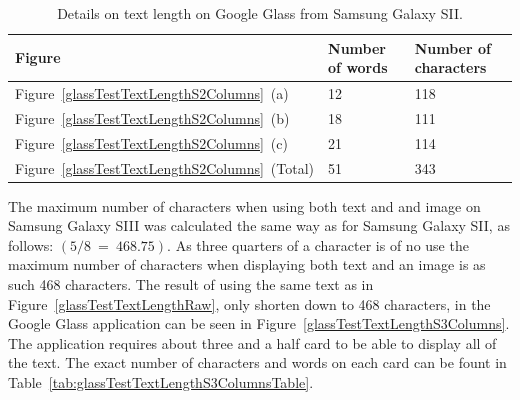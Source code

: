 	\begin{table}[ht!]
    		\caption{Details on text length on Google Glass from Samsung Galaxy SII.} \label{tab:glassTestTextLengthS2ColumnsTable}
		\centering \begin{tabularx}{\textwidth}{l|X|X} \hline
		\textbf{Figure} & \textbf{Number of words} & \textbf{Number of characters} \\ \hline \hline
       
		Figure~\ref{glassTestTextLengthS2Columns}~(a)	&12	&118	\\ \hline
		Figure~\ref{glassTestTextLengthS2Columns}~(b)	&18	&111	\\ \hline
		Figure~\ref{glassTestTextLengthS2Columns}~(c)	&21	&114	\\ \hline
		Figure~\ref{glassTestTextLengthS2Columns}~(Total)	&51	&343	\\ \hline
		
		\end{tabularx}
	\end{table}

The maximum number of characters when using both text and and image on Samsung Galaxy SIII was calculated the same way as for Samsung Galaxy SII, as follows: \((5/8~=~468.75)\). As three quarters of a character is of no use the maximum number of characters when displaying both text and an image is as such 468 characters. The result of using the same text as in Figure~\ref{glassTestTextLengthRaw}, only shorten down to 468 characters, in the Google Glass application can be seen in Figure~\ref{glassTestTextLengthS3Columns}. The application requires about three and a half card to be able to display all of the text. The exact number of characters and words on each card can be fount in Table~\ref{tab:glassTestTextLengthS3ColumnsTable}.


